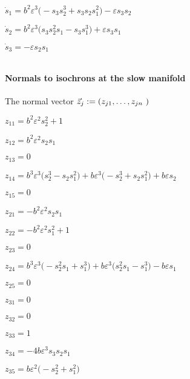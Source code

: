 \documentclass[11pt,a5paper]{article}
\def\eps{\varepsilon}
\begin{document}
\(\dot s_{1}=b^{2} \eps^{3} \big(-s_{3} s_{2}^{3}+s_{3} s_{2} s_{1}^{2}
\big)-\eps s_{3} s_{2}
\)\par

\(\dot s_{2}=b^{2} \eps^{3} \big(s_{3} s_{2}^{2} s_{1}-s_{3} s_{1}^{3}
\big)+\eps s_{3} s_{1}
\)\par

\(\dot s_{3}=-\eps s_{2} s_{1}
\)\par

\(
\)
\paragraph{Normals to isochrons at the slow manifold}
The normal vector \(\vec z\sb j:=(z\sb{j1},\ldots,z\sb{jn}\
)\)
\(
\)\par

\(z_{11}=b^{2} \eps^{2} s_{2}^{2}+1
\)\par

\(z_{12}=b^{2} \eps^{2} s_{2} s_{1}
\)\par

\(z_{13}=0
\)\par

\(z_{14}=b^{3} \eps^{3} \big(s_{2}^{3}-s_{2} s_{1}^{2}\big)+b \eps^{3} 
\big(-s_{2}^{3}+s_{2} s_{1}^{2}\big)+b \eps s_{2}
\)\par

\(z_{15}=0
\)\par

\(z_{21}=-b^{2} \eps^{2} s_{2} s_{1}
\)\par

\(z_{22}=-b^{2} \eps^{2} s_{1}^{2}+1
\)\par

\(z_{23}=0
\)\par

\(z_{24}=b^{3} \eps^{3} \big(-s_{2}^{2} s_{1}+s_{1}^{3}\big)+b \eps^{3} 
\big(s_{2}^{2} s_{1}-s_{1}^{3}\big)-b \eps s_{1}
\)\par

\(z_{25}=0
\)\par

\(z_{31}=0
\)\par

\(z_{32}=0
\)\par

\(z_{33}=1
\)\par

\(z_{34}=-4 b \eps^{3} s_{3} s_{2} s_{1}
\)\par

\(z_{35}=b \eps^{2} \big(-s_{2}^{2}+s_{1}^{2}\big)
\)\par
\end{document}
